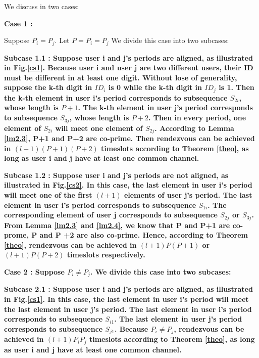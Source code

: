 \documentclass[10pt, conference, letterpaper]{IEEEtran}
\begin{document}
\begin{IEEEproof}
We discuss in two cases:

\bfseries Case 1 \mdseries:

 Suppose $P_i = P_j$. Let $P = P_i =P_j$ We divide this case into two subcases:

\bfseries Subcase 1.1 \mdseries: Suppose user i and j's periods are aligned, as illustrated in Fig.\ref{cs1}. Because user i and user j are two different users, their ID must be different in at least one digit. Without lose of generality, suppose the k-th digit in $ID_i$ is 0 while the k-th digit in $ID_j$ is 1. Then the k-th element in user i's period corresponds to subsequence $S_{2i}$, whose length is $P+1$. The k-th element in user j's period corresponds to subsequence $S_{3j}$, whose length is $P+2$. Then in every period, one element of $S_{2i}$ will meet one element of $S_{2j}$. According to Lemma \ref{lm2.3}, P+1 and P+2 are co-prime. Then rendezvous can be achieved in $(l+ 1)(P+1)(P+2)$ timeslots according to Theorem \ref{theo}, as long as user i and j have at least one common channel.

\bfseries Subcase 1.2 \mdseries: Suppose user i and j's periods are not aligned, as illustrated in Fig.\ref{cs2}. In this case, the last element in user i's period will meet one of the first $(l + 1)$ elements of user j's period. The last element in user i's period corresponds to subsequence $S_{1i}$. The corresponding element of user j corresponds to subsequence $S_{2j}$ or $S_{3j}$. From Lemma \ref{lm2.3} and \ref{lm2.4}, we know that P and P+1 are co-prome, P and P +2 are also co-prime. Hence, according to Theorem \ref{theo}, rendezvous can be achieved in $(l + 1)P(P+1)$ or $(l + 1)P(P+2)$ timeslots respectively.

\bfseries Case 2 \mdseries: Suppose $P_i \ne P_j$.  We divide this case into two subcases:

\bfseries Subcase 2.1 \mdseries: Suppose user i and j's periods are aligned, as illustrated in Fig.\ref{cs1}. In this case, the last
element in user i's period will meet the last element in user j's period. The last element in user i's period corresponds to subsequence $S_{i1}$. The last element in user j's period corresponds to subsequence $S_{j1}$. Because $P_i \ne P_j$, rendezvous can be achieved in $(l + 1)P_iP_j$ timeslots according to Theorem \ref{theo}, as long as user i and j have at least one common channel.


\end{IEEEproof}
\end{document}

